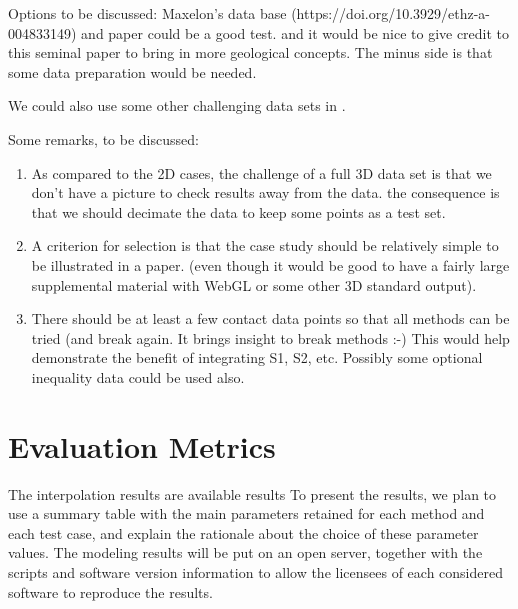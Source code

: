\documentclass[final]{ring20}
\begin{document}
{%

Options to be discussed: Maxelon's data base (https://doi.org/10.3929/ethz-a-004833149) and paper \citep{Maxelon2009CG} could be a good test. and it would be nice to give credit to this seminal paper to bring in more geological concepts. The minus side is that some data preparation would be needed. 

We could also use some other challenging data sets in \citep{Laurent2016EaPSL,Grose2019JoSG,Sprague2005Ga}. 

Some remarks, to be discussed: 
\begin{enumerate}
\item As compared to the 2D cases, the challenge of a full 3D data set is that we don't have a picture to check results away from the data. the consequence is that we should decimate the data to keep some points as a test set. 

\item A criterion for selection is that the case study should be relatively simple to be illustrated in a paper. (even though it would be good to have a fairly large supplemental material with WebGL or some other 3D standard output). 

\item There should be at least a few contact data points so that all methods can be tried (and break again. It brings insight to break methods :-) 
This would help demonstrate the benefit of integrating S1, S2, etc. Possibly some optional inequality data could be used also. 

\end{enumerate}

\section{Evaluation Metrics}\label{sec:results}

The interpolation results are available results 
To present the results, we plan to use a summary table with the main parameters retained for each method and each test case, and explain the rationale about the choice of these parameter values. The modeling results will be put on an open server, together with the scripts and software version information to allow the licensees of each considered software to reproduce the results. 

}
\end{document}
